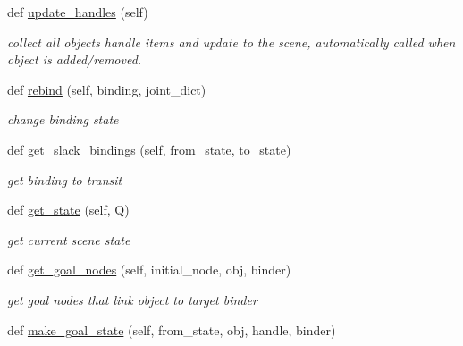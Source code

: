 \begin{DoxyCompactItemize}
def \hyperlink{classrnb-planning_1_1src_1_1pkg_1_1planning_1_1scene_1_1_planning_scene_aa87ad00baefece92548c6c8b6e720741}{update\+\_\+handles} (self)
\begin{DoxyCompactList}\small\item\em collect all objects\textquotesingle{} handle items and update to the scene, automatically called when object is added/removed. \end{DoxyCompactList}\item 
def \hyperlink{classrnb-planning_1_1src_1_1pkg_1_1planning_1_1scene_1_1_planning_scene_ae11a6a3a10a261ed791cf17d3e0073c5}{rebind} (self, binding, joint\+\_\+dict)
\begin{DoxyCompactList}\small\item\em change binding state \end{DoxyCompactList}\item 
def \hyperlink{classrnb-planning_1_1src_1_1pkg_1_1planning_1_1scene_1_1_planning_scene_a201cc902f1da53fe25239275fc5a3c93}{get\+\_\+slack\+\_\+bindings} (self, from\+\_\+state, to\+\_\+state)
\begin{DoxyCompactList}\small\item\em get binding to transit \end{DoxyCompactList}\item 
\mbox{\label{classrnb-planning_1_1src_1_1pkg_1_1planning_1_1scene_1_1_planning_scene_a458924c1ecbfd1b88c30cece0eba0e9f}} 
def \hyperlink{classrnb-planning_1_1src_1_1pkg_1_1planning_1_1scene_1_1_planning_scene_a458924c1ecbfd1b88c30cece0eba0e9f}{get\+\_\+state} (self, Q)
\begin{DoxyCompactList}\small\item\em get current scene state \end{DoxyCompactList}\item 
def \hyperlink{classrnb-planning_1_1src_1_1pkg_1_1planning_1_1scene_1_1_planning_scene_a6b3ea317ee0b7cc798e902990baa010c}{get\+\_\+goal\+\_\+nodes} (self, initial\+\_\+node, obj, binder)
\begin{DoxyCompactList}\small\item\em get goal nodes that link object to target binder \end{DoxyCompactList}\item 
def \hyperlink{classrnb-planning_1_1src_1_1pkg_1_1planning_1_1scene_1_1_planning_scene_aeb068479c191e2167f371a9f103c7b59}{make\+\_\+goal\+\_\+state} (self, from\+\_\+state, obj, handle, binder)

\end{DoxyCompactItemize}
